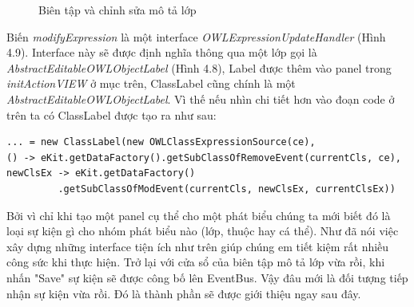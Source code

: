 \begin{figure}[h!]
	\centering
	\caption{Biên tập và chỉnh sửa mô tả lớp\label{overflow}}
\end{figure}
Biến \textit{modifyExpression} là một interface \textit{OWLExpressionUpdateHandler} (Hình 4.9).  Interface này sẽ được định nghĩa thông qua một lớp gọi là \textit{AbstractEditableOWLObjectLabel} (Hình 4.8), Label được thêm vào panel trong \textit{initActionVIEW} ở mục trên, ClassLabel cũng chính là một \textit{AbstractEditableOWLObjectLabel}. Vì thế nếu nhìn chi tiết hơn vào đoạn code ở trên ta có ClassLabel được tạo ra như sau:
\begin{verbatim}
... = new ClassLabel(new OWLClassExpressionSource(ce),
() -> eKit.getDataFactory().getSubClassOfRemoveEvent(currentCls, ce),
newClsEx -> eKit.getDataFactory()
         .getSubClassOfModEvent(currentCls, newClsEx, currentClsEx))
\end{verbatim}
Bởi vì chỉ khi tạo một panel cụ thể cho một phát biểu chúng ta mới biết đó là loại sự kiện gì cho nhóm phát biểu nào (lớp, thuộc hay cá thể). Như đã nói việc xây dựng những interface tiện ích như trên giúp chúng em tiết kiệm rất nhiều công sức khi thực hiện. Trở lại với cửa sổ của biên tập mô tả lớp vừa rồi, khi nhấn "Save" sự kiện sẽ được công bố lên EventBus. Vậy đâu mới là đối tượng tiếp nhận sự kiện vừa rồi. Đó là thành phần sẽ được giới thiệu ngay sau đây.

